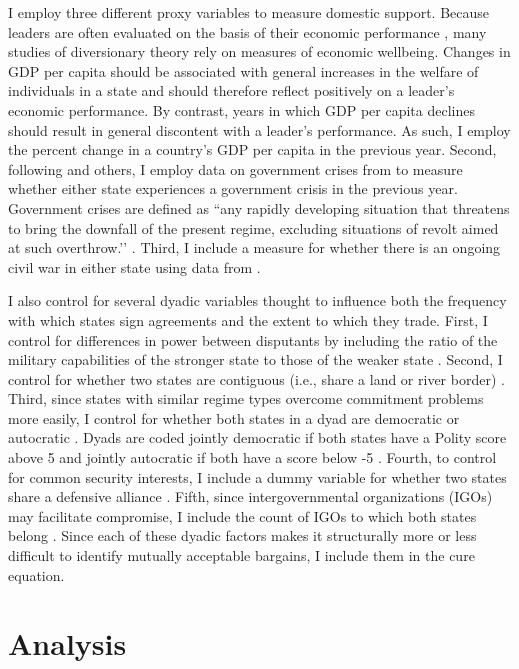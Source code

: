 I employ three different proxy variables to measure domestic support. Because leaders are often evaluated on the basis of their economic performance \citep[e.g.][]{hibbs1987, mackuen1992}, many studies of diversionary theory rely on measures of economic wellbeing. Changes in GDP per capita should be associated with general increases in the welfare of individuals in a state and should therefore reflect positively on a leader's economic performance. By contrast, years in which GDP per capita declines should result in general discontent with a leader's performance. As such, I employ the percent change in a country’s GDP per capita in the previous year. Second, following \citet{enterline2000} and others, I employ data on government crises from \citet{banks2020} to measure whether either state experiences a government crisis in the previous year. Government crises are defined as ``any rapidly developing situation that threatens to bring the downfall of the present regime, excluding situations of revolt aimed at such overthrow.’’ \citep{zotero-4818}. Third, I include a measure for whether there is an ongoing civil war in either state using data from \citep{sarkees2010}.


I also control for several dyadic variables thought to influence both the frequency with which states sign agreements and the extent to which they trade. First, I control for differences in power between disputants by including the ratio of the military capabilities of the stronger state to those of the weaker state \citep{singer1972, singer1987}.   Second, I control for whether two states are contiguous (i.e., share a land or river border) \citep{stinnett2002}. Third, since states with similar regime types overcome commitment problems more easily, I control for whether both states in a dyad are democratic or autocratic \citep{leeds1999}. Dyads are coded jointly democratic if both states have a Polity score above 5 and jointly autocratic if both have a score below -5 \citep{marshall2002}. Fourth, to control for common security interests, I include a dummy variable for whether two states share a defensive alliance \citep{leeds2002}. Fifth, since intergovernmental organizations (IGOs) may facilitate compromise, I include the count of IGOs to which both states belong \citep{pevehouse2019}. Since each of these dyadic factors makes it structurally more or less difficult to identify mutually acceptable bargains, I include them in the cure equation. 

\section{Analysis}

